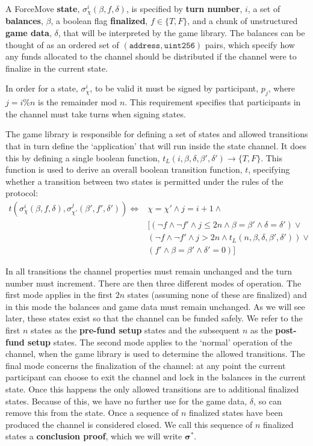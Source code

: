 \documentclass{article}
\begin{document}
A ForceMove \textbf{state}, $\sigma_\chi^i(\beta, f, \delta)$, is specified by \textbf{turn number}, $i$,
a set of \textbf{balances}, $\beta$, a boolean flag \textbf{finalized}, $f \in \{T, F\}$, and
a chunk of unstructured \textbf{game data}, $\delta$, that will be interpreted by the game library. The
balances can be thought of as an ordered set of $(\texttt{address}, \texttt{uint256})$ pairs,
which specify how any funds allocated to the channel should be distributed if the channel 
were to finalize in the current state.

In order for a state, $\sigma_\chi^i$, to be valid it must be signed by participant, $p_j$,
where $j = i \% n$ is the remainder mod $n$. This requirement specifies that participants
in the channel must take turns when signing states.

The game library is responsible for defining a set of states and allowed transitions that
in turn define the `application' that will run inside the state channel. It does this by
defining a single boolean function, $t_L(i, \beta, \delta, \beta', \delta') \rightarrow \{ T, F\}$.
This function is used to derive an overall boolean transition function, $t$, specifying whether
a transition between two states is permitted under the rules of the protocol:
\begin{align*}
  t(\sigma_\chi^i(\beta, f, \delta), \sigma_{\chi'}^j(\beta', f', \delta') ) \Leftrightarrow &
    \chi = \chi'
    \wedge j = i + 1
    \wedge \\
    & [ (\neg f \wedge \neg f' \wedge j \leq 2n \wedge \beta = \beta' \wedge \delta = \delta') \vee \\
    & (\neg f \wedge \neg f' \wedge j > 2n \wedge t_L(n, \beta, \delta, \beta', \delta')) \vee \\
    & (f' \wedge \beta = \beta' \wedge \delta' = 0) ]
\end{align*}

In all transitions the channel properties must remain unchanged and the turn number must increment.
There are then three different modes of operation. The first mode applies in the first $2n$
states (assuming none of these are finalized) and in this mode the balances and game data
must remain unchanged. As we will see later, these states exist so that the channel can be
funded safely. We refer to the first $n$ states as the \textbf{pre-fund setup} states and
the subsequent $n$ as the \textbf{post-fund setup} states. The second mode applies to the
`normal' operation of the channel, when the game library is used to determine the allowed
transitions. The final mode concerns the finalization of the channel: at any point the current
participant can choose to exit the channel and lock in the balances in the current state.
Once this happens the only allowed transitions are to additional finalized states. Because
of this, we have no further use for the game data, $\delta$, so can remove this from the state.
Once a sequence of $n$ finalized states have been produced the channel is considered closed. We
call this sequence of $n$ finalized states a \textbf{conclusion proof}, which we will write $\bm{\sigma}^*$.
\end{document}
